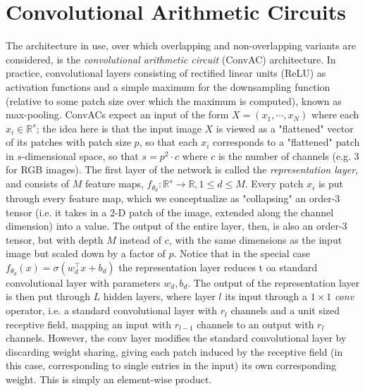 \documentclass{article}
\begin{document}
\section{Convolutional Arithmetic Circuits}
The architecture in use, over which overlapping and non-overlapping variants are considered, is the \textit{convolutional arithmetic circuit} (ConvAC) architecture. In practice, convolutional layers consisting of rectified linear units (ReLU) as activation functions and a simple maximum for the downsampling function (relative to some patch size over which the maximum is computed), known as max-pooling. ConvACs expect an input of the form $ X = (x_1, \cdots, x_N) $ where each $ x_i \in \mathbb{R}^s $; the idea here is that the input image $ X $ is viewed as a "flattened" vector of its patches with patch size $ p $, so that each $ x_i $ corresponds to a "flattened" patch in $ s $-dimensional space, so that $ s = p^2 \cdot c $ where $ c $ is the number of channels (e.g. 3 for RGB images).
\newline \newline
The first layer of the network is called the \textit{representation layer}, and consists of $ M $ feature maps, $ f_{\theta_d}: \mathbb{R}^s \rightarrow \mathbb{R}, 1 \leq d \leq M $. Every patch $ x_i $ is put through every feature map, which we conceptualize as "collapsing" an order-3 tensor (i.e. it takes in a 2-D patch of the image, extended along the channel dimension) into a value. The output of the entire layer, then, is also an order-3 tensor, but with depth $ M $ instead of $ c $, with the same dimensions as the input image but scaled down by a factor of $ p $. Notice that in the special case $ f_{\theta_d}(x) = \sigma(w_d^\intercal x + b_d) $ the representation layer reduces t oa standard convolutional layer with parameters $ w_d, b_d $.
\newline \newline
The output of the representation layer is then put through $ L $ hidden layers, where layer $ l $ its input through a $ 1 \times 1 $ \textit{conv} operator, i.e. a standard convolutional layer with $ r_l $ channels and a unit sized receptive field, mapping an input with $ r_{l - 1} $ channels to an output with $ r_l $ channels. However, the conv layer modifies the standard convolutional layer by discarding weight sharing, giving each patch induced by the receptive field (in this case, corresponding to single entries in the input) its own corresponding weight. This is simply an element-wise product.
\newline
\end{document}

